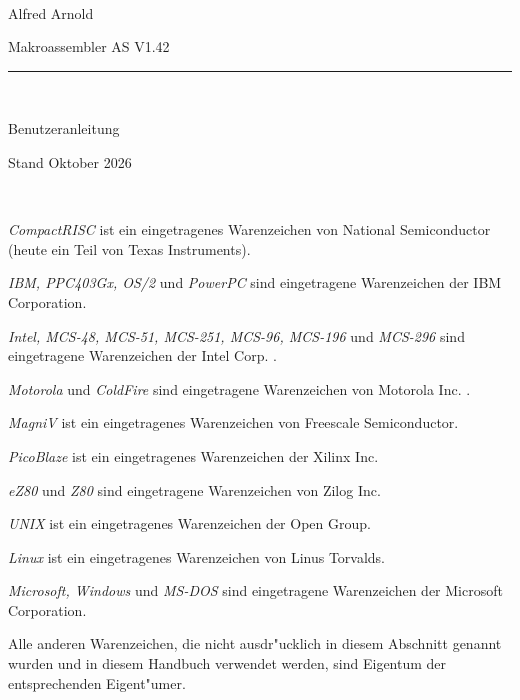 \documentclass[12pt,a4paper,twoside]{report}
\newcommand{\asname}{AS}
\begin{document}
\thispagestyle{empty}

\
\vspace{7cm}\par

\begin{raggedright}
{\large Alfred Arnold}\\
\vspace{1cm}\par
{\huge Makroassembler \asname{} V1.42}\\
\rule{14cm}{0.3mm}\\
\vspace{2mm}\par
{\huge Benutzeranleitung}

\vspace{1cm}\par

{\large Stand Oktober 2026}
\end{raggedright}

\clearpage
\thispagestyle{empty}

\ \vspace{4cm}

{\em CompactRISC} ist ein eingetragenes Warenzeichen von National
 Semiconductor (heute ein Teil von Texas Instruments).

{\em IBM, PPC403Gx, OS/2} und {\em PowerPC} sind eingetragene Warenzeichen
der IBM Corporation.

{\em Intel, MCS-48, MCS-51, MCS-251, MCS-96, MCS-196} und {\em MCS-296}
sind eingetragene Warenzeichen der Intel Corp. .

{\em Motorola} und {\em ColdFire} sind eingetragene Warenzeichen von
Motorola Inc. .

{\em MagniV} ist ein eingetragenes Warenzeichen von Freescale Semiconductor.

{\em PicoBlaze} ist ein eingetragenes Warenzeichen der Xilinx Inc.

{\em eZ80} und {\em Z80} sind eingetragene Warenzeichen von Zilog Inc.

{\em UNIX} ist ein eingetragenes Warenzeichen der Open Group.

{\em Linux} ist ein eingetragenes Warenzeichen von Linus Torvalds.

{\em Microsoft, Windows} und {\em MS-DOS} sind eingetragene Warenzeichen
der Microsoft Corporation.

Alle anderen Warenzeichen, die nicht ausdr"ucklich in diesem Abschnitt
genannt wurden und in diesem Handbuch verwendet werden, sind Eigentum
der entsprechenden Eigent"umer.
\end{document}
